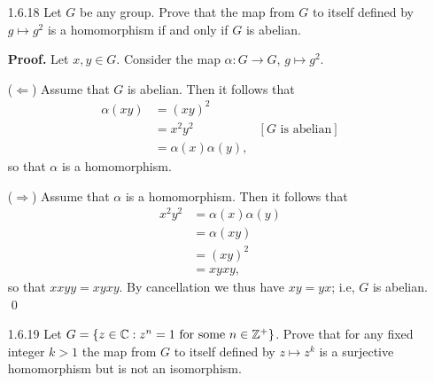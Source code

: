 \begin{enumerate}
      ($\Rightarrow$) Assume that $\alpha$ is a homomorphism. Then it
      follows that
      \begin{align*}
         xy &= \alpha(x^{-1})\alpha(y^{-1}) \\
            &= \alpha(x^{-1}y^{-1}) \\
            &= \alpha((yx)^{-1}) \\
            &= yx,
      \end{align*}
      so that $G$ is abelian. \qed
   \item[1.6.18]  Let $G$ be any group. Prove that the map from $G$ to itself
                  defined by $g \mapsto g^2$ is a homomorphism if and only if
                  $G$ is abelian.

      \textbf{Proof.} Let $x, y \in G$. Consider the map
      $\alpha : G \rightarrow G$, $g \mapsto g^2$. 

      ($\Leftarrow$) Assume that $G$ is abelian. Then it
      follows that
      \begin{align*}
         \alpha(xy) &= (xy)^2 \\
            &= x^2y^2 &[G \text{ is abelian}] \\
            &= \alpha(x)\alpha(y),
      \end{align*}
      so that $\alpha$ is a homomorphism.

      ($\Rightarrow$) Assume that $\alpha$ is a homomorphism. Then it
      follows that
      \begin{align*}
         x^2y^2 &= \alpha(x)\alpha(y) \\
            &= \alpha(xy) \\
            &= (xy)^2 \\
            &= xyxy,
      \end{align*}
      so that $xxyy = xyxy$. By cancellation we thus have $xy = yx$; i.e, $G$ is
      abelian. \qed
   \item[1.6.19]  Let $G = \{z \in \mathbb{C} : z^n = 1 \text{ for some }n \in \mathbb{Z}^+\}$.
                  Prove that for any fixed integer $k > 1$ the map from $G$ to
                  itself defined by $z \mapsto z^k$ is a surjective homomorphism
                  but is not an isomorphism.


\end{enumerate}

